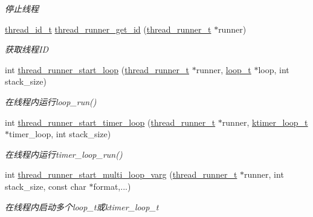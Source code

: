 \begin{DoxyCompactItemize}
\begin{DoxyCompactList}\small\item\em 停止线程 \end{DoxyCompactList}\item 
\hyperlink{a00051_ad0ada5642d10ce71bdd90816182f9b79_ad0ada5642d10ce71bdd90816182f9b79}{thread\+\_\+id\+\_\+t} \hyperlink{a00109_gae009856d195b3cd75ad7d0b4b4c10c85_gae009856d195b3cd75ad7d0b4b4c10c85}{thread\+\_\+runner\+\_\+get\+\_\+id} (\hyperlink{a00051_a9054159cde2f926ef61c28ce1e555199_a9054159cde2f926ef61c28ce1e555199}{thread\+\_\+runner\+\_\+t} $\ast$runner)
\begin{DoxyCompactList}\small\item\em 获取线程\+I\+D \end{DoxyCompactList}\item 
int \hyperlink{a00109_ga93f88ba77e7eab786da6fe7d1f681a2e_ga93f88ba77e7eab786da6fe7d1f681a2e}{thread\+\_\+runner\+\_\+start\+\_\+loop} (\hyperlink{a00051_a9054159cde2f926ef61c28ce1e555199_a9054159cde2f926ef61c28ce1e555199}{thread\+\_\+runner\+\_\+t} $\ast$runner, \hyperlink{a00051_a9c3ad1cd2de83e09f3a7b59fa82c94ee_a9c3ad1cd2de83e09f3a7b59fa82c94ee}{loop\+\_\+t} $\ast$loop, int stack\+\_\+size)
\begin{DoxyCompactList}\small\item\em 在线程内运行loop\+\_\+run() \end{DoxyCompactList}\item 
int \hyperlink{a00109_ga9191991e2bd7f91fe68324c2855d581d_ga9191991e2bd7f91fe68324c2855d581d}{thread\+\_\+runner\+\_\+start\+\_\+timer\+\_\+loop} (\hyperlink{a00051_a9054159cde2f926ef61c28ce1e555199_a9054159cde2f926ef61c28ce1e555199}{thread\+\_\+runner\+\_\+t} $\ast$runner, \hyperlink{a00051_a024af2aa29615e7a811ea6c45438157d_a024af2aa29615e7a811ea6c45438157d}{ktimer\+\_\+loop\+\_\+t} $\ast$timer\+\_\+loop, int stack\+\_\+size)
\begin{DoxyCompactList}\small\item\em 在线程内运行timer\+\_\+loop\+\_\+run() \end{DoxyCompactList}\item 
int \hyperlink{a00109_ga99f710b40a68688398172bd27470dddf_ga99f710b40a68688398172bd27470dddf}{thread\+\_\+runner\+\_\+start\+\_\+multi\+\_\+loop\+\_\+varg} (\hyperlink{a00051_a9054159cde2f926ef61c28ce1e555199_a9054159cde2f926ef61c28ce1e555199}{thread\+\_\+runner\+\_\+t} $\ast$runner, int stack\+\_\+size, const char $\ast$format,...)
\begin{DoxyCompactList}\small\item\em 在线程内启动多个loop\+\_\+t或ktimer\+\_\+loop\+\_\+t \end{DoxyCompactList}\item 

\end{DoxyCompactItemize}
